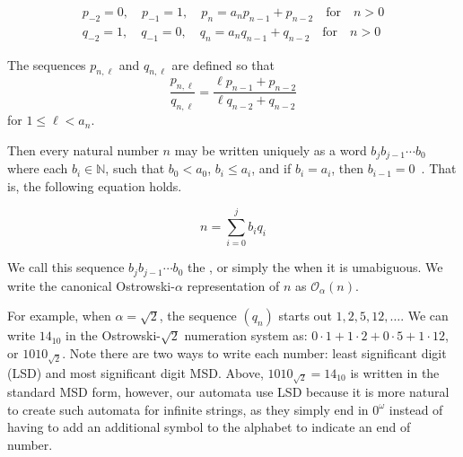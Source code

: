 \begin{equation}\label{eqn:conv-def}
\begin{split}
    p_{-2} = 0, \quad p_{-1} = 1, \quad p_n = a_n p_{n-1} + p_{n-2} \quad \text{for} \quad n > 0\\
    q_{-2} = 1, \quad q_{-1} = 0, \quad q_n = a_n q_{n-1} + q_{n-2} \quad \text{for} \quad n > 0
\end{split}
\end{equation}



The  sequences $p_{n,\ell}$ and $q_{n,\ell}$ are defined so that
\[
    \frac{p_{n,\ell}}{q_{n,\ell}} = \frac{\ell p_{n-1} + p_{n-2}}{\ell q_{n-2} + q_{n-2}}
\]
for $1 \leq \ell < a_n$.

Then every natural number $n$ may be written uniquely as a word $b_j b_{j-1} \cdots b_0$ where each $b_i \in \mathbb{N}$, such that $b_0 < a_0$, $b_i \leq a_i$, and if $b_i = a_i$, then $b_{i-1} = 0$~\cite{Ostrowski1922}.
That is, the following equation holds.

\begin{equation*}\label{eqn:ostrowski-def}
    n = \sum_{i=0}^j b_i q_i
\end{equation*}

We call this sequence $b_j b_{j-1} \cdots b_0$ the , or simply the  when it is umabiguous.
We write the canonical Ostrowski-$\alpha$ representation of $n$ as $\mathcal{O}_{\alpha}(n)$.

For example, when $\alpha = \sqrt{2}$, the sequence $(q_n)$ starts out $1,2,5,12,\ldots$.
We can write $14_{10}$ in the Ostrowski-$\sqrt{2}$ numeration system as: $0\cdot1 + 1\cdot2 + 0\cdot5 + 1\cdot12$, or $1010_{\sqrt{2}}$.
Note there are two ways to write each number: least significant digit (LSD) and most significant digit MSD.
Above, $1010_{\sqrt{2}} = 14_{10}$ is written in the standard MSD form, however, our automata use LSD because it is more natural to create such automata for infinite strings, as they simply end in $0^\omega$ instead of having to add an additional symbol to the alphabet to indicate an end of number.

